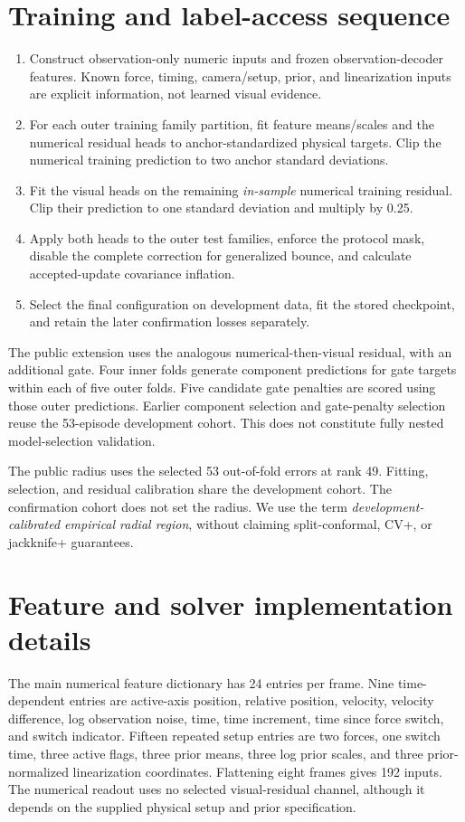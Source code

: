 \documentclass[11pt]{article}
\begin{document}
\section{Training and label-access sequence}
\begin{enumerate}
\item Construct observation-only numeric inputs and frozen observation-decoder features. Known force, timing, camera/setup, prior, and linearization inputs are explicit information, not learned visual evidence.
\item For each outer training family partition, fit feature means/scales and the numerical residual heads to anchor-standardized physical targets. Clip the numerical training prediction to two anchor standard deviations.
\item Fit the visual heads on the remaining \emph{in-sample} numerical training residual. Clip their prediction to one standard deviation and multiply by 0.25.
\item Apply both heads to the outer test families, enforce the protocol mask, disable the complete correction for generalized bounce, and calculate accepted-update covariance inflation.
\item Select the final configuration on development data, fit the stored checkpoint, and retain the later confirmation losses separately.
\end{enumerate}
The public extension uses the analogous numerical-then-visual residual, with an additional gate. Four inner folds generate component predictions for gate targets within each of five outer folds. Five candidate gate penalties are scored using those outer predictions. Earlier component selection and gate-penalty selection reuse the 53-episode development cohort. This does not constitute fully nested model-selection validation.

The public radius uses the selected 53 out-of-fold errors at rank 49. Fitting, selection, and residual calibration share the development cohort. The confirmation cohort does not set the radius. We use the term \emph{development-calibrated empirical radial region}, without claiming split-conformal, CV+, or jackknife+ guarantees.

\section{Feature and solver implementation details}
The main numerical feature dictionary has 24 entries per frame. Nine time-dependent entries are active-axis position, relative position, velocity, velocity difference, log observation noise, time, time increment, time since force switch, and switch indicator. Fifteen repeated setup entries are two forces, one switch time, three active flags, three prior means, three log prior scales, and three prior-normalized linearization coordinates. Flattening eight frames gives 192 inputs. The numerical readout uses no selected visual-residual channel, although it depends on the supplied physical setup and prior specification.
\end{document}
